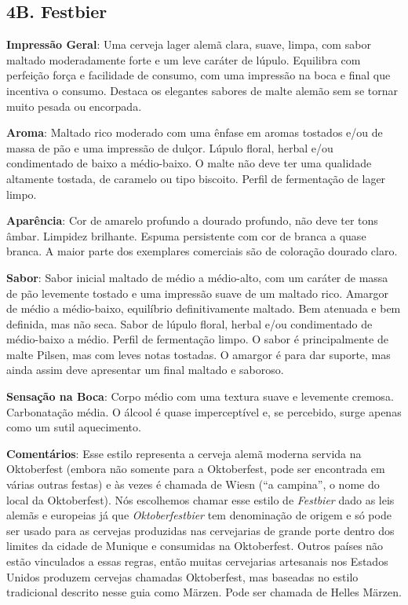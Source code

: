 \subsection*{4B. Festbier}
\textbf{Impressão Geral}: Uma cerveja lager alemã clara, suave, limpa, com sabor maltado moderadamente forte e um leve caráter de lúpulo. Equilibra com perfeição força e facilidade de consumo, com uma impressão na boca e final que incentiva o consumo. Destaca os elegantes sabores de malte alemão sem se tornar muito pesada ou encorpada.

\textbf{Aroma}: Maltado rico moderado com uma ênfase em aromas tostados e/ou de massa de pão e uma impressão de dulçor. Lúpulo floral, herbal e/ou condimentado de baixo a médio-baixo. O malte não deve ter uma qualidade altamente tostada, de caramelo ou tipo biscoito. Perfil de fermentação de lager limpo.

\textbf{Aparência}: Cor de amarelo profundo a dourado profundo, não deve ter tons âmbar. Limpidez brilhante. Espuma persistente com cor de branca a quase branca. A maior parte dos exemplares comerciais são de coloração dourado claro.

\textbf{Sabor}: Sabor inicial maltado de médio a médio-alto, com um caráter de massa de pão levemente tostado e uma impressão suave de um maltado rico. Amargor de médio a médio-baixo, equilíbrio definitivamente maltado. Bem atenuada e bem definida, mas não seca. Sabor de lúpulo floral, herbal e/ou condimentado de médio-baixo a médio. Perfil de fermentação limpo. O sabor é principalmente de malte Pilsen, mas com leves notas tostadas. O amargor é para dar suporte, mas ainda assim deve apresentar um final maltado e saboroso.

\textbf{Sensação na Boca}: Corpo médio com uma textura suave e levemente cremosa. Carbonatação média. O álcool é quase imperceptível e, se percebido, surge apenas como um sutil aquecimento.

\textbf{Comentários}: Esse estilo representa a cerveja alemã moderna servida na Oktoberfest (embora não somente para a Oktoberfest, pode ser encontrada em várias outras festas) e às vezes é chamada de Wiesn (“a campina”, o nome do local da Oktoberfest). Nós escolhemos chamar esse estilo de \textit{Festbier} dado as leis alemãs e europeias já que \textit{Oktoberfestbier} tem denominação de origem e só pode ser usado para as cervejas produzidas nas cervejarias de grande porte dentro dos limites da cidade de Munique e consumidas na Oktoberfest. Outros países não estão vinculados a essas regras, então muitas cervejarias artesanais nos Estados Unidos produzem cervejas chamadas Oktoberfest, mas baseadas no estilo tradicional descrito nesse guia como Märzen. Pode ser chamada de Helles Märzen.

